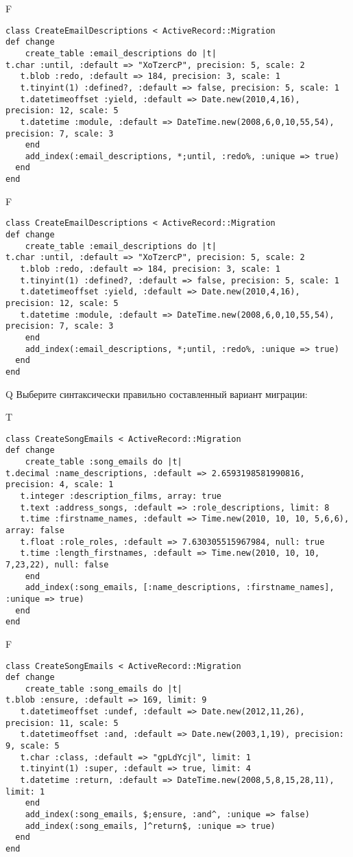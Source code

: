 F
\begin{verbatim}
class CreateEmailDescriptions < ActiveRecord::Migration
def change
	create_table :email_descriptions do |t|
t.char :until, :default => "XoTzercP", precision: 5, scale: 2
   t.blob :redo, :default => 184, precision: 3, scale: 1
   t.tinyint(1) :defined?, :default => false, precision: 5, scale: 1
   t.datetimeoffset :yield, :default => Date.new(2010,4,16), precision: 12, scale: 5
   t.datetime :module, :default => DateTime.new(2008,6,0,10,55,54), precision: 7, scale: 3
   	end
	add_index(:email_descriptions, *;until, :redo%, :unique => true)
  end 
end

\end{verbatim}

F
\begin{verbatim}
class CreateEmailDescriptions < ActiveRecord::Migration
def change
	create_table :email_descriptions do |t|
t.char :until, :default => "XoTzercP", precision: 5, scale: 2
   t.blob :redo, :default => 184, precision: 3, scale: 1
   t.tinyint(1) :defined?, :default => false, precision: 5, scale: 1
   t.datetimeoffset :yield, :default => Date.new(2010,4,16), precision: 12, scale: 5
   t.datetime :module, :default => DateTime.new(2008,6,0,10,55,54), precision: 7, scale: 3
   	end
	add_index(:email_descriptions, *;until, :redo%, :unique => true)
  end 
end

\end{verbatim}

Q
Выберите синтаксически правильно составленный вариант миграции:

T
\begin{verbatim}
class CreateSongEmails < ActiveRecord::Migration
def change
	create_table :song_emails do |t|
t.decimal :name_descriptions, :default => 2.6593198581990816, precision: 4, scale: 1
   t.integer :description_films, array: true
   t.text :address_songs, :default => :role_descriptions, limit: 8
   t.time :firstname_names, :default => Time.new(2010, 10, 10, 5,6,6), array: false
   t.float :role_roles, :default => 7.630305515967984, null: true
   t.time :length_firstnames, :default => Time.new(2010, 10, 10, 7,23,22), null: false
   	end
	add_index(:song_emails, [:name_descriptions, :firstname_names], :unique => true)
  end 
end

\end{verbatim}

F
\begin{verbatim}
class CreateSongEmails < ActiveRecord::Migration
def change
	create_table :song_emails do |t|
t.blob :ensure, :default => 169, limit: 9
   t.datetimeoffset :undef, :default => Date.new(2012,11,26), precision: 11, scale: 5
   t.datetimeoffset :and, :default => Date.new(2003,1,19), precision: 9, scale: 5
   t.char :class, :default => "gpLdYcjl", limit: 1
   t.tinyint(1) :super, :default => true, limit: 4
   t.datetime :return, :default => DateTime.new(2008,5,8,15,28,11), limit: 1
   	end
	add_index(:song_emails, $;ensure, :and^, :unique => false)
 	add_index(:song_emails, ]^return$, :unique => true)
  end 
end

\end{verbatim}

